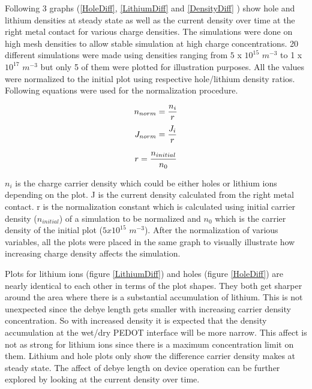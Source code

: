 \begin{doublespace}
 Following 3 graphs (\ref{HoleDiff}, \ref{LithiumDiff} and \ref{DensityDiff} ) show hole and lithium densities at steady state as well as the current density over time at the right metal contact for various charge densities. The simulations were done on high mesh densities to allow stable simulation at high charge concentrations. 20 different simulations were made using densities ranging from $5$ x $10^{15}$  $m^{-3}$ to 1 x $10^{17}$  $m^{-3}$ but only 5 of them were plotted for illustration purposes. All the values were normalized to the initial plot using respective hole/lithium density ratios. Following equations were used for the normalization procedure.


\begin{equation}
\centering
n_{norm}= \frac{n_i}{r} 
\end{equation}
\begin{equation}
\centering
J_{norm}= \frac{J_i}{r} 
\end{equation}

\begin{equation}
\centering
r = \frac{n_{initial}}{n_{0}}
\label{NormConst}
\end{equation}

$n_{i}$ is the charge carrier density which could be either holes or lithium ions depending on the plot. J is the current density calculated from the right metal contact. r is the normalization constant which is calculated using initial carrier density ($n_{initial}$) of a simulation to be normalized and $n_{0}$ which is the carrier density of the initial plot ($5x10^{15}$ $m^{-3}$). After the normalization of various variables, all the plots were placed in the same graph to visually illustrate how increasing charge density affects the simulation. 

Plots for lithium ions (figure \ref{LithiumDiff}) and holes (figure \ref{HoleDiff}) are nearly identical to each other in terms of the plot shapes. They both get sharper around the area where there is a substantial accumulation of lithium. This is not unexpected since the debye length gets smaller with increasing carrier density concentration. So with increased density it is expected that the density accumulation at the wet/dry PEDOT interface will be more narrow. This affect is not as strong for lithium ions since there is a maximum concentration limit on them. Lithium and hole plots only show the difference carrier density makes at steady state. The affect of debye length on device operation can be further explored by looking at the current density over time.   


\end{doublespace}
